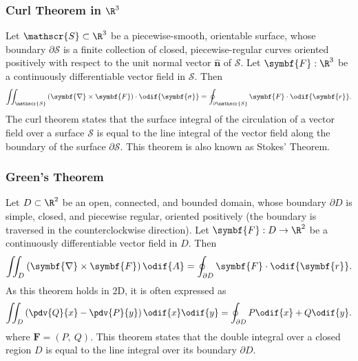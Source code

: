 \documentclass{article}
\begin{document}
\subsubsection{Curl Theorem in \texorpdfstring{\(\R^3\)}{R3}}
Let \(\mathscr{S} \subset \R^3\) be a piecewise-smooth, orientable
surface, whose boundary \(\partial \mathscr{S}\) is a finite collection of closed,
    piecewise-regular curves oriented positively with respect to the
    unit normal vector \(\hat{\symbf{n}}\) of \(\mathscr{S}\). Let
    \(\symbf{F} : \R^3\) be a continuously differentiable vector field
    in \(\mathscr{S}\). Then
\begin{equation*}
    \iint_{\mathscr{S}} \left( \symbf{\nabla} \times \symbf{F} \right) \cdot \odif{\symbf{\sigma}} = \oint_{\partial \mathscr{S}} \symbf{F} \cdot \odif{\symbf{r}}.
\end{equation*}
The curl theorem states that the surface integral of the circulation of
a vector field over a surface \(\mathscr{S}\) is equal to the line integral
of the vector field along the boundary of the surface \(\partial \mathscr{S}\). This theorem is also known as Stokes' Theorem.
\subsubsection{Green's Theorem}
Let \(D \subset \R^2\) be an open, connected, and bounded domain, whose
boundary \(\partial D\) is simple, closed, and piecewise regular, oriented
    positively (the boundary is traversed in the counterclockwise
    direction). Let \(\symbf{F} : D \to \R^2\) be a continuously
    differentiable vector field in \(D\). Then
\begin{equation*}
    \iint_D \left( \symbf{\nabla} \times \symbf{F} \right) \odif{A} = \oint_{\partial D} \symbf{F} \cdot \odif{\symbf{r}}.
\end{equation*}
As this theorem holds in 2D, it is often expressed as
\begin{equation*}
    \iint_D \left( \pdv{Q}{x} - \pdv{P}{y} \right) \odif{x} \odif{y} = \oint_{\partial D} P \odif{x} + Q \odif{y}.
\end{equation*}
where \(\symbf{F} = \left( P,\: Q \right)\). This theorem states
that the double integral over a closed region \(D\) is equal to the line
integral over its boundary \(\partial D\).
\end{document}
